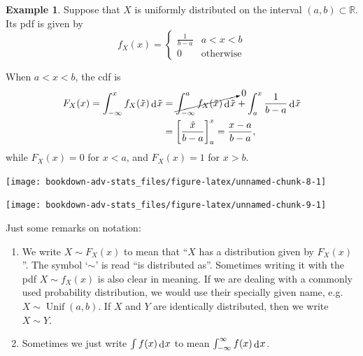 \documentclass[
]{book}
\DeclareMathOperator{\Unif}{Unif}
\newcommand{\bbR}{\mathbb{R}}
\DeclareMathOperator{\dd}{d}
\newcommand{\dint}{\dd\hspace{0.5pt}\!}
\theoremstyle{definition}
\theoremstyle{definition}
\newtheorem{example}{Example}[chapter]
\theoremstyle{definition}
\theoremstyle{definition}
\theoremstyle{remark}
\begin{document}
\begin{example}

Suppose that \(X\) is uniformly distributed on the interval \((a,b) \subset \bbR\).
Its pdf is given by
\[
f_X(x) = \begin{cases}
\frac{1}{b-a} & a < x < b \\
0 & \text{otherwise}
\end{cases}
\]

When \(a < x < b\), the cdf is
\begin{align*}
F_X(x) 
= \int_{-\infty}^x f_X(\tilde x) \dint \tilde x 
&=\cancelto{0}{\int_{-\infty}^a f_X(\tilde x) \dint \tilde x}  + \int_{a}^x \frac{1}{b-a} \dint \tilde x \\
&= \left[ \frac{\tilde x}{b-a} \right]_a^x = \frac{x-a}{b-a},
\end{align*}
while \(F_X(x) = 0\) for \(x<a\), and \(F_X(x)=1\) for \(x>b\).

\begin{center}\texttt{[image: bookdown-adv-stats\_files/figure-latex/unnamed-chunk-8-1]} \end{center}

\begin{center}\texttt{[image: bookdown-adv-stats\_files/figure-latex/unnamed-chunk-9-1]} \end{center}

\end{example}

Just some remarks on notation:

\begin{enumerate}
\def\labelenumi{\arabic{enumi}.}
\item
  We write \(X \sim F_X(x)\) to mean that ``\(X\) has a distribution given by \(F_X(x)\)''.
  The symbol `\(\sim\)' is read ``is distributed as''.
  Sometimes writing it with the pdf \(X \sim f_X(x)\) is also clear in meaning.
  If we are dealing with a commonly used probability distribution, we would use their specially given name, e.g.~\(X\sim \Unif(a,b)\).
  If \(X\) and \(Y\) are identically distributed, then we write \(X\sim Y\).
\item
  Sometimes we just write \(\int f(x) \dint x\) to mean \(\int_{-\infty}^{\infty} f(x) \dint x\).
\end{enumerate}
\end{document}
